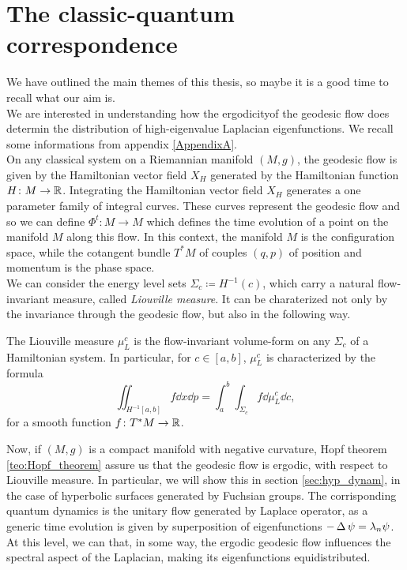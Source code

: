 \section{The classic-quantum correspondence}

We have outlined the main themes of this thesis, so maybe it is a good time to recall what our aim is.\\
We are interested in understanding how the ergodicityof the geodesic flow does determin the distribution of high-eigenvalue Laplacian eigenfunctions. We recall some informations from appendix \ref{AppendixA}.\\

On any classical system on a Riemannian manifold $(M,g)$, the geodesic flow is given by the Hamiltonian vector field $X_{H}$ generated by the Hamiltonian function $H\colon M\to\mathbb{R}$. Integrating the Hamiltonian vector field $X_{H}$ generates a one parameter family of integral curves. These curves represent the geodesic flow and so we can define $\Phi^{t}\colon M\to M$ which defines the time evolution of a point on the manifold $M$ along this flow. In this context, the manifold $M$ is the configuration space, while the cotangent bundle $T^{\ast}M$ of couples $(q,p)$ of position and momentum is the phase space.\\
We can consider the energy level sets $\Sigma_{c}\coloneqq H^{-1}(c)$, which carry a natural flow-invariant measure, called \emph{Liouville measure}. It can be charaterized not only by the invariance through the geodesic flow, but also in the following way.

\begin{defin}
\label{def:Liouville_measure}
The Liouville measure $\mu_{L}^{c}$ is the flow-invariant volume-form on any  $\Sigma_{c}$ of a Hamiltonian system. In particular, for $c\in [a,b]$, $\mu_{L}^{c}$ is characterized by the formula
\[
\iint_{H^{-1}[a,b]}f\dd x\dd p=\int_{a}^{b}\int_{\Sigma_{c}}f \dd\mu_{L}^{c}\dd c,
\]
for a smooth function $f\colon T^{\ast}M\to\mathbb{R}$.
\end{defin}

Now, if $(M,g)$ is a compact manifold with negative curvature, Hopf theorem \ref{teo:Hopf_theorem} assure us that the geodesic flow is ergodic, with respect to Liouville measure. In particular, we will show this in section \ref{sec:hyp_dynam}, in the case of hyperbolic surfaces generated by Fuchsian groups. The corrisponding quantum dynamics is the unitary flow generated by Laplace operator, as a generic time evolution is given by superposition of eigenfunctions $-\operatorname{\Delta}\psi=\lambda_{n}\psi$. At this level, we can  that, in some way, the ergodic geodesic flow influences the spectral aspect of the Laplacian, making its eigenfunctions equidistributed.\\

